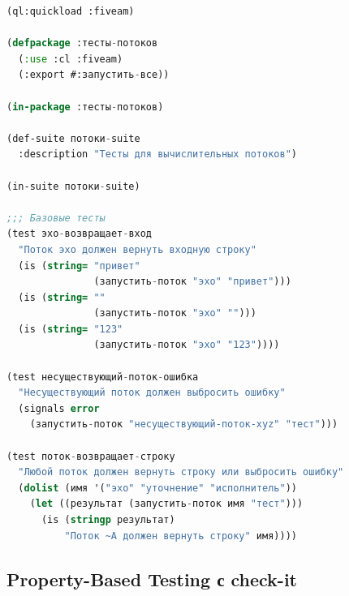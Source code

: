\documentclass[12pt, a4paper, twoside]{article}
\begin{document}
\begin{lstlisting}[language=CommonLisp,caption={Настройка fiveam для потоков}]
(ql:quickload :fiveam)

(defpackage :тесты-потоков
  (:use :cl :fiveam)
  (:export #:запустить-все))

(in-package :тесты-потоков)

(def-suite потоки-suite
  :description "Тесты для вычислительных потоков")

(in-suite потоки-suite)

;;; Базовые тесты
(test эхо-возвращает-вход
  "Поток эхо должен вернуть входную строку"
  (is (string= "привет"
               (запустить-поток "эхо" "привет")))
  (is (string= ""
               (запустить-поток "эхо" "")))
  (is (string= "123"
               (запустить-поток "эхо" "123"))))

(test несуществующий-поток-ошибка
  "Несуществующий поток должен выбросить ошибку"
  (signals error
    (запустить-поток "несуществующий-поток-xyz" "тест")))

(test поток-возвращает-строку
  "Любой поток должен вернуть строку или выбросить ошибку"
  (dolist (имя '("эхо" "уточнение" "исполнитель"))
    (let ((результат (запустить-поток имя "тест")))
      (is (stringp результат)
          "Поток ~A должен вернуть строку" имя))))
\end{lstlisting}

\subsection{Property-Based Testing с check-it}
\end{document}
